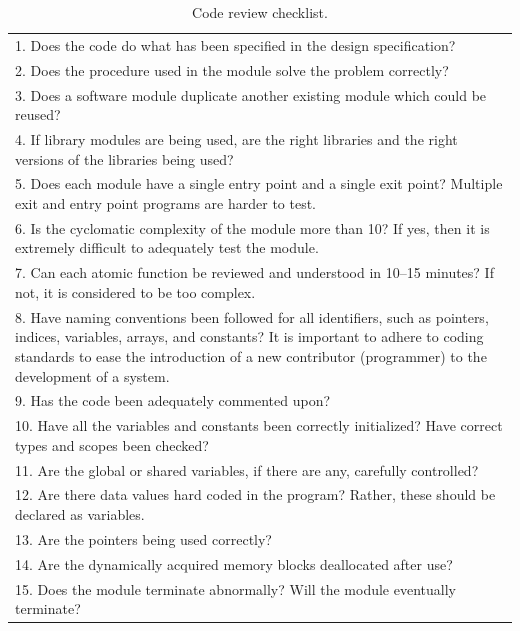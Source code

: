 \begin{table}[H]
    \centering
    \renewcommand{\arraystretch}{1.2}
    \caption{Code review checklist.}
    \label{tab:code-checklist}
    \begin{adjustbox}{max height=\textheight, max width=\textwidth}
        \begin{tabular}{p{\textwidth}}
            \toprule
            1. Does the code do what has been specified in the design specification?\\
            2. Does the procedure used in the module solve the problem correctly?\\
            3. Does a software module duplicate another existing module which could be reused?\\
            4. If library modules are being used, are the right libraries and the right versions of the libraries being used?\\
            5. Does each module have a single entry point and a single exit point? Multiple exit and entry point programs are harder to test.\\
            6. Is the cyclomatic complexity of the module more than 10? If yes, then it is extremely difficult to adequately test the module.\\
            7. Can each atomic function be reviewed and understood in 10–15 minutes? If not, it is considered to be too complex.\\
            8. Have naming conventions been followed for all identifiers, such as pointers, indices, variables, arrays, and constants? It is important to adhere to coding standards to ease the introduction of a new contributor (programmer) to the development of a system.\\
            9. Has the code been adequately commented upon?\\
            10. Have all the variables and constants been correctly initialized? Have correct types and scopes been checked?\\
            11. Are the global or shared variables, if there are any, carefully controlled?\\
            12. Are there data values hard coded in the program? Rather, these should be declared as variables.\\
            13. Are the pointers being used correctly?\\
            14. Are the dynamically acquired memory blocks deallocated after use?\\
            15. Does the module terminate abnormally? Will the module eventually terminate?\\

\end{tabular}
\end{adjustbox}
\end{table}
